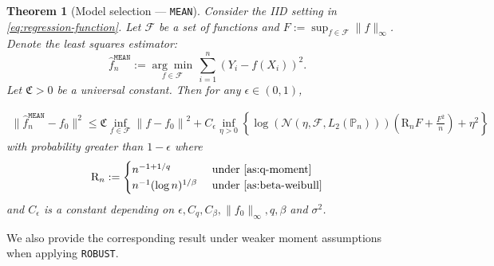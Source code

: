 \documentclass[12pt]{article}
\newtheorem{theorem}{Theorem}[section]
\begin{document}
\begin{theorem}[Model selection --- \texttt{MEAN}]\label{thm:oracle-cv}
	Consider the IID setting in \eqref{eq:regression-function}. Let $\mathcal{F}$ be a set of functions and $F := \sup_{f \in \mathcal{F}}\|f\|_\infty$. Denote the least squares estimator:
	\begin{equation*}
\widehat{f}^{\mathtt{MEAN}}_n:=\underset{f \in \mathcal{F}}{\arg \min }  \, \sum_{i=1}^n\left(Y_i-f(X_i)\right)^2.
\end{equation*}
Let $\mathfrak{C} > 0$ be a universal constant. Then for any $\epsilon \in (0,1)$, 

\begin{equation}
\begin{aligned}
\|\widehat{f}^{\mathtt{MEAN}}_n-f_0\|^2 \le  \mathfrak{C}\inf_{f \in \mathcal{F}} \left\|f-f_0\right\|^2 +C_\epsilon\inf _{\eta>0}\left\{\log \left(\mathcal{N}\left(\eta, \mathcal{F}, L_2\left(\mathbb{P}_n\right)\right)\right)\left(\mathrm{R}_n F+\frac{F^2}{n}\right)+\eta^2\right\}
\end{aligned}
\end{equation}
with probability greater than $1-\epsilon$ where
\begin{align}\label{eq:oracle-remainder}
    \mathrm{R}_n := \begin{cases}
        n^{-1+1/q} &\text{ under }\Cref{as:q-moment}\\
        n^{-1}(\log n)^{1/\beta} &\text{ under }\Cref{as:beta-weibull}
    \end{cases}
\end{align}
and $C_\epsilon$ is a constant depending on $\epsilon, C_q, C_{\beta}, \|f_0\|_\infty, q,\beta$ and $\sigma^2$.
\end{theorem}

We also provide the corresponding result under weaker moment assumptions when applying \texttt{ROBUST}.
\end{document}
